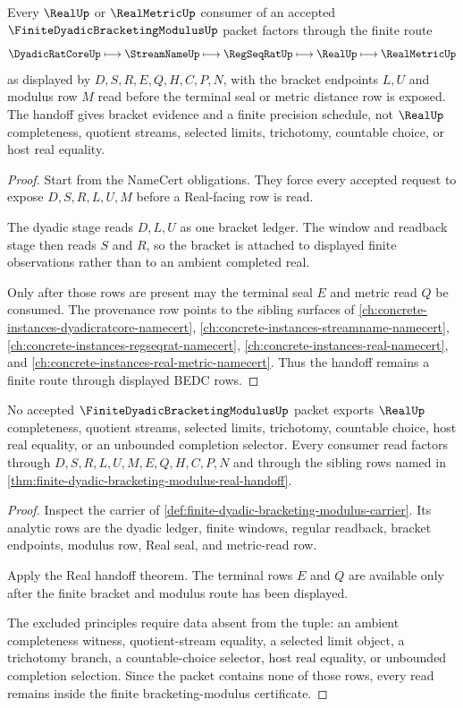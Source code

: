 \begin{theorem}
\label{thm:finite-dyadic-bracketing-modulus-real-handoff}
Every $\RealUp$ or $\RealMetricUp$ consumer of an accepted $\FiniteDyadicBracketingModulusUp$ packet factors through the finite route
$$
\DyadicRatCoreUp \longmapsto \StreamNameUp \longmapsto \RegSeqRatUp \longmapsto \RealUp \longmapsto \RealMetricUp
$$
as displayed by $D,S,R,E,Q,H,C,P,N$, with the bracket endpoints $L,U$ and modulus row $M$ read before the terminal seal or metric distance row is exposed. The handoff gives bracket evidence and a finite precision schedule, not $\RealUp$ completeness, quotient streams, selected limits, trichotomy, countable choice, or host real equality.
\end{theorem}
\begin{proof}
Start from the NameCert obligations. They force every accepted request to expose $D,S,R,L,U,M$ before a Real-facing row is read.

The dyadic stage reads $D,L,U$ as one bracket ledger. The window and readback stage then reads $S$ and $R$, so the bracket is attached to displayed finite observations rather than to an ambient completed real.

Only after those rows are present may the terminal seal $E$ and metric read $Q$ be consumed. The provenance row points to the sibling surfaces of \autoref{ch:concrete-instances-dyadicratcore-namecert}, \autoref{ch:concrete-instances-streamname-namecert}, \autoref{ch:concrete-instances-regseqrat-namecert}, \autoref{ch:concrete-instances-real-namecert}, and \autoref{ch:concrete-instances-real-metric-namecert}. Thus the handoff remains a finite route through displayed BEDC rows.
\end{proof}

\begin{theorem}
\label{thm:finite-dyadic-bracketing-modulus-nonescape}
No accepted $\FiniteDyadicBracketingModulusUp$ packet exports $\RealUp$ completeness, quotient streams, selected limits, trichotomy, countable choice, host real equality, or an unbounded completion selector. Every consumer read factors through $D,S,R,L,U,M,E,Q,H,C,P,N$ and through the sibling rows named in \autoref{thm:finite-dyadic-bracketing-modulus-real-handoff}.
\end{theorem}
\begin{proof}
Inspect the carrier of \autoref{def:finite-dyadic-bracketing-modulus-carrier}. Its analytic rows are the dyadic ledger, finite windows, regular readback, bracket endpoints, modulus row, Real seal, and metric-read row.

Apply the Real handoff theorem. The terminal rows $E$ and $Q$ are available only after the finite bracket and modulus route has been displayed.

The excluded principles require data absent from the tuple: an ambient completeness witness, quotient-stream equality, a selected limit object, a trichotomy branch, a countable-choice selector, host real equality, or unbounded completion selection. Since the packet contains none of those rows, every read remains inside the finite bracketing-modulus certificate.
\end{proof}

